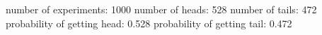 number of experiments: 1000
number of heads: 528
number of tails: 472
probability of getting head: 0.528
probability of getting tail: 0.472
